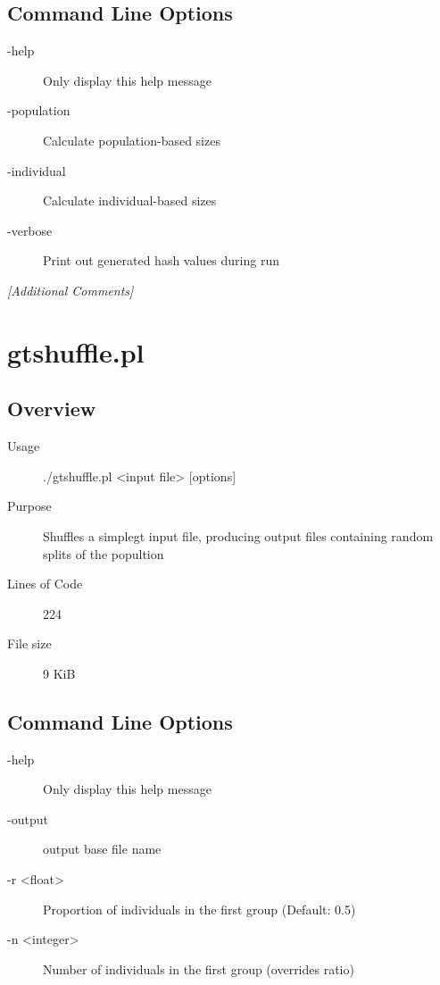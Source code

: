\subsection{Command Line Options}
\label{sec:gtminimal.pl-command-line}

\begin{description}
\item[-help] Only display this help message
\item[-population] Calculate population-based sizes
\item[-individual] Calculate individual-based sizes
\item[-verbose] Print out generated hash values during run
\end{description}

\emph{[Additional Comments]}

\section{gtshuffle.pl}
\label{sec:gtshuffle.pl}

\subsection{Overview}
\label{sec:gtshuffle.pl-overview}

\begin{description}
\item[Usage] ./gtshuffle.pl <input file> [options]
\item[Purpose] Shuffles a simplegt input file, producing output files containing random splits of the popultion
\item[Lines of Code] 224
\item[File size] 9 KiB
\end{description}

\subsection{Command Line Options}
\label{sec:gtshuffle.pl-command-line}

\begin{description}
\item[-help] Only display this help message
\item[-output] output base file name
\item[-r <float>] Proportion of individuals in the first group (Default: 0.5)
\item[-n <integer>] Number of individuals in the first group (overrides ratio)
\end{description}

